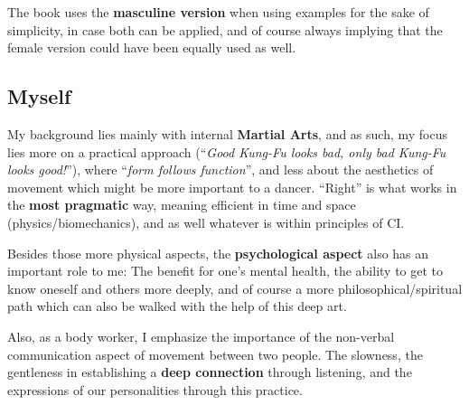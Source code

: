 The book uses the \textbf{masculine version} when using examples for the sake of simplicity, in case both can be applied, and of course always implying that the female version could have been equally used as well.

\subsection{Myself}\label{subsec:myself}

My background lies mainly with internal \textbf{Martial Arts}, and as such, my focus lies more on a practical approach (``\textit{Good Kung-Fu looks bad, only bad Kung-Fu looks good!}''), where ``\textit{form follows function}'', and less about the aesthetics of movement which might be more important to a dancer.
``Right'' is what works in the \textbf{most pragmatic} way, meaning efficient in time and space (physics/biomechanics), and as well whatever is within principles of CI.

Besides those more physical aspects, the \textbf{psychological aspect} also has an important role to me: The benefit for one's mental health, the ability to get to know oneself and others more deeply, and of course a more philosophical/spiritual path which can also be walked with the help of this deep art.

Also, as a body worker, I emphasize the importance of the non-verbal communication aspect of movement between two people.
The slowness, the gentleness in establishing a \textbf{deep connection} through listening, and the expressions of our personalities through this practice.

